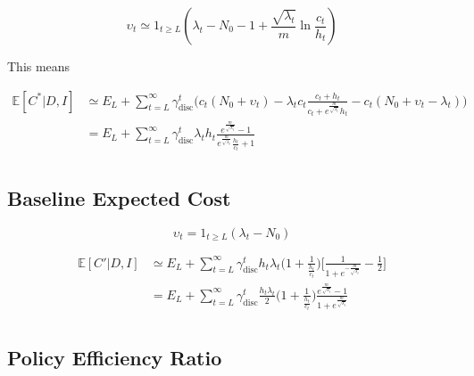 \begin{equation}
	\upsilon_t\simeq 1_{t\geq L}(\lambda_t-N_0-1+\frac{\sqrt{\lambda_t}}{m}\ln\frac{c_t}{h_t}) 
\end{equation}

This means

\begin{equation}
	\begin{split}
		\mathbb{E}[C^*|D,I] &\simeq E_L+ \sum_{t=L}^{\infty} \gamma_{\text{disc}}^{t} \bigg( 
		c_t(N_0 + \upsilon_t)- \lambda_tc_t\frac{c_t+h_t}{c_t+e^{\frac{m}{\sqrt{\lambda_t}}}h_t}- c_t(N_0 + \upsilon_t-\lambda_t)\bigg)\\
		&= E_L+\sum_{t=L}^{\infty} \gamma_{\text{disc}}^{t} \lambda_th_t\frac{e^{\frac{m}{\sqrt{\lambda_t}}}-1}{e^{\frac{m}{\sqrt{\lambda_t}}}\frac{h_t}{c_t}+1}\\
	\end{split}
\end{equation}

\subsection{Baseline Expected Cost}

\begin{equation}
	\upsilon_t= 1_{t\geq L}(\lambda_t-N_0)
\end{equation}

\begin{equation}
	\begin{split}
		\mathbb{E}[C'|D,I] &\simeq E_L+\sum_{t=L}^{\infty} \gamma_{\text{disc}}^{t} h_t\lambda_t 
		\bigg(1+\frac{1}{\frac{h_t}{c_t}}\bigg)\bigg[\frac{1}{1+e^{-\frac{m}{\sqrt{\lambda_t}}}}- \frac{1}{2}\bigg]\\
		&= E_L+\sum_{t=L}^{\infty} \gamma_{\text{disc}}^{t} \frac{h_t\lambda_t}{2} 
		\bigg(1+\frac{1}{\frac{h_t}{c_t}}\bigg)\frac{e^{\frac{m}{\sqrt{\lambda_t}}}-1}{1+e^{\frac{m}{\sqrt{\lambda_t}}}}\\
	\end{split}
\end{equation}


\subsection{Policy Efficiency Ratio}

